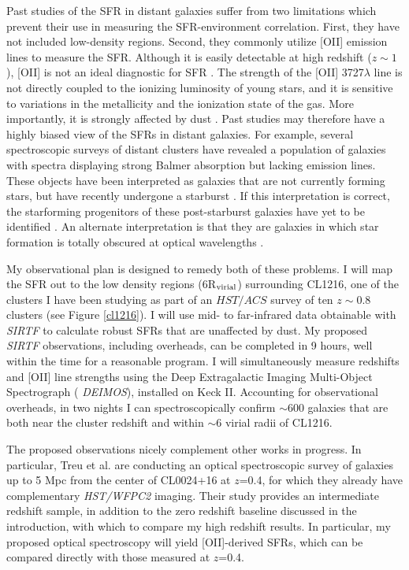\documentclass[12pt]{plan}
\begin{document}
Past studies of the SFR in distant galaxies suffer from two
limitations which prevent their use in measuring the SFR-environment
correlation.  First, they have not included low-density regions.
Second, they commonly utilize [OII] emission lines to measure the SFR.
Although it is easily detectable at high redshift ($z \sim 1$), [OII]
is not an ideal diagnostic for SFR \cite{Jansen01,Charlot01}. The
strength of the [OII] 3727$\lambda$ line is not directly coupled to
the ionizing luminosity of young stars, and it is sensitive to
variations in the metallicity and the ionization state of the gas.
More importantly, it is strongly affected by dust
\cite{Blain99,Flores99,Smail99,Poggianti00,Fadda00,Duc02}.  Past
studies may therefore have a highly biased view of the SFRs in distant
galaxies.  For example, several spectroscopic surveys of distant
clusters \cite{Couch87,Fabricant91,Fisher98,Dressler99,Poggianti99}
have revealed a population of galaxies with spectra displaying strong
Balmer absorption but lacking emission lines.  These objects have been
interpreted as galaxies that are not currently forming stars, but have
recently undergone a starburst \cite{Couch87,Poggianti99}. If this
interpretation is correct, the starforming progenitors of these
post-starburst galaxies have yet to be identified \cite{Couch01}.  An
alternate interpretation is that they are galaxies in which star
formation is totally obscured at optical wavelengths \cite{Smail99}.

My observational plan is designed to remedy both of these problems.  I
will map the SFR out to the low density regions (6R$_{\rm virial}$)
surrounding CL1216, one of the clusters I have been studying as part
of an $HST/ACS$ survey of ten $z \sim 0.8$ clusters (see Figure
\ref{cl1216}).  I will use mid- to far-infrared data obtainable with
\emph{SIRTF} to calculate robust SFRs that are unaffected by dust.  My
proposed \emph{SIRTF} observations, including overheads, can be
completed in 9 hours, well within the time for a reasonable program. I
will simultaneously measure redshifts and [OII] line strengths using
the Deep Extragalactic Imaging Multi-Object Spectrograph ({\em
DEIMOS}), installed on Keck II.  Accounting for observational
overheads, in two nights I can spectroscopically confirm $\sim$600
galaxies that are both near the cluster redshift and within $\sim$6
virial radii of CL1216.

The proposed observations nicely complement other works in progress.
In particular, Treu et al.\cite{Treu03} are conducting an optical
spectroscopic survey of galaxies up to 5 Mpc from the center of
CL0024+16 at $z$=0.4, for which they already have complementary {\em
HST/WFPC2} imaging.  Their study provides an intermediate redshift
sample, in addition to the zero redshift baseline discussed in the
introduction, with which to compare my high redshift results.  In
particular, my proposed optical spectroscopy will yield [OII]-derived
SFRs, which can be compared directly with those measured at $z$=0.4.
\end{document}
